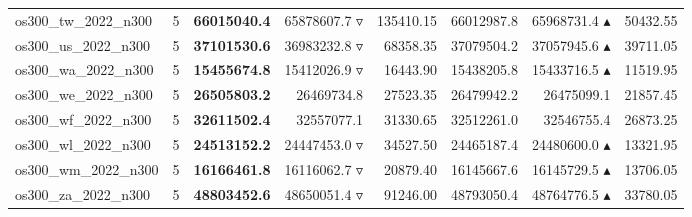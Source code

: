 \begin{table}[]
{\begin{tabular}{ll@{\hspace{1.2cm}}rrr@{\hspace{1.2cm}}rrr}
os300_tw_2022_n300 & 5 & \textbf{66015040.4} & 65878607.7 $\triangledown$ & 135410.15 & 66012987.8 & 65968731.4 $\blacktriangle$ & 50432.55 \\
os300_us_2022_n300 & 5 & \textbf{37101530.6} & 36983232.8 $\triangledown$ & 68358.35 & 37079504.2 & 37057945.6 $\blacktriangle$ & 39711.05 \\
os300_wa_2022_n300 & 5 & \textbf{15455674.8} & 15412026.9 $\triangledown$ & 16443.90 & 15438205.8 & 15433716.5 $\blacktriangle$ & 11519.95 \\
os300_we_2022_n300 & 5 & \textbf{26505803.2} & 26469734.8 \phantom{$\blacktriangle$} & 27523.35 & 26479942.2 & 26475099.1 \phantom{$\blacktriangle$} & 21857.45 \\
os300_wf_2022_n300 & 5 & \textbf{32611502.4} & 32557077.1 \phantom{$\blacktriangle$} & 31330.65 & 32512261.0 & 32546755.4 \phantom{$\blacktriangle$} & 26873.25 \\
os300_wl_2022_n300 & 5 & \textbf{24513152.2} & 24447453.0 $\triangledown$ & 34527.50 & 24465187.4 & 24480600.0 $\blacktriangle$ & 13321.95 \\
os300_wm_2022_n300 & 5 & \textbf{16166461.8} & 16116062.7 $\triangledown$ & 20879.40 & 16145667.6 & 16145729.5 $\blacktriangle$ & 13706.05 \\
os300_za_2022_n300 & 5 & \textbf{48803452.6} & 48650051.4 $\triangledown$ & 91246.00 & 48793050.4 & 48764776.5 $\blacktriangle$ & 33780.05 \\
\bottomrule
    \end{tabular}
    }
\end{table}
